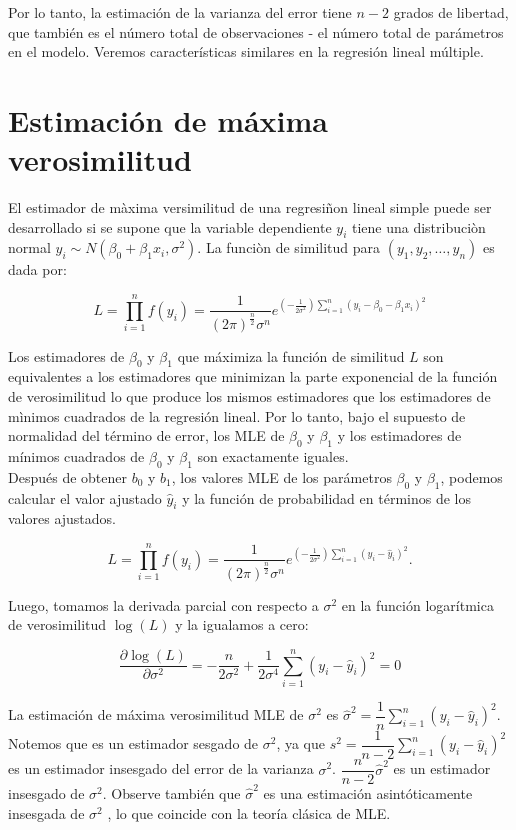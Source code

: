 Por lo tanto, la estimación de la varianza del error tiene $n - 2$ grados de libertad, que también es el número total de observaciones - el número total de parámetros en el modelo. Veremos características similares en la regresión lineal múltiple.


\section{Estimación de máxima verosimilitud}

El estimador de màxima versimilitud de una regresiñon lineal simple puede ser desarrollado si se supone que la variable dependiente $y_i$ tiene una distribuciòn normal $y_i\sim N\left(\beta_0+\beta_1x_i,\sigma^2\right)$. La funciòn de similitud para $\left(y_1,y_2,\ldots,y_n\right)$ es dada por:

$$L=\prod_{i=1}^n f\left(y_i\right)=\dfrac{1}{(2\pi)^{\frac{n}{2}}\sigma^n}e^{\left(-\frac{1}{2\sigma^2}\right)\sum\limits_{i=1}^n \left(y_i-\beta_0-\beta_1x_i\right)^2}$$

Los estimadores de $\beta_0$ y $\beta_1$ que máximiza la función de similitud $L$ son equivalentes a los estimadores que minimizan la parte exponencial de la función de verosimilitud lo que produce los mismos estimadores que los estimadores de mìnimos cuadrados de la regresión lineal. Por lo tanto, bajo el supuesto de normalidad del término de error, los MLE de $\beta_0$ y $\beta_1$ y los estimadores de mínimos cuadrados de $\beta_0$ y $\beta_1$ son exactamente iguales.\\

Después de obtener $b_0$ y $b_1$, los valores MLE de los parámetros $\beta_0$ y $\beta_1$, podemos calcular el valor ajustado $\hat{y}_i$ y la función de probabilidad en términos de los valores ajustados.

$$L=\prod_{i=1}^n f\left(y_i\right)=\dfrac{1}{(2\pi)^{\frac{n}{2}}\sigma^n}e^{\left(-\frac{1}{2\sigma^2}\right)\sum\limits_{i=1}^n \left(y_i-\hat{y}_i\right)^2}.$$

Luego, tomamos la derivada parcial con respecto a $\sigma^2$ en la función logarítmica de verosimilitud $\log(L)$ y la igualamos a cero:

$$\dfrac{\partial \log(L)}{\partial \sigma^2}=-\dfrac{n}{2\sigma^2}+\dfrac{1}{2\sigma^4}\sum_{i=1}^n \left(y_i-\hat{y}_i\right)^2=0$$

La estimación de máxima verosimilitud MLE de $\sigma^2$ es $\hat{\sigma}^2=\dfrac{1}{n}\displaystyle\sum_{i=1}^n\left(y_i-\hat{y}_i\right)^2$. Notemos que es un estimador sesgado de $\sigma^2$, ya que
$s^2=\dfrac{1}{n-2}\displaystyle\sum_{i=1}^n\left(y_i-\hat{y}_i\right)^2$ es un estimador insesgado del error de la varianza $\sigma^2$. $\dfrac{n}{n-2}\hat{\sigma}^2$ es un estimador insesgado de $\sigma^2$. Observe también  que $\hat{\sigma}^2$ es una estimación asintóticamente insesgada de $\sigma^2$ , lo que coincide con la teoría clásica de MLE.


